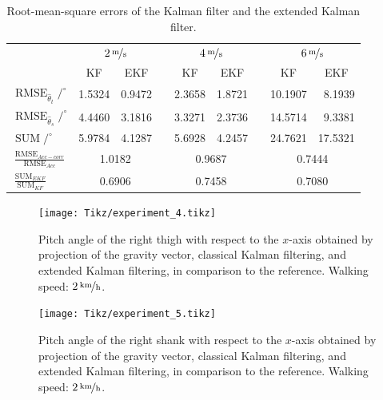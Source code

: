 \begin{table}\centering
{}
\begin{tabular}{@{}lrrcrrcrr@{}}\toprule
& \multicolumn{2}{c}{$\unitfrac[2]{m}{s}$} & \phantom{abc} & \multicolumn{2}{c}{$\unitfrac[4]{m}{s}$} &
\phantom{abc} & \multicolumn{2}{c}{$\unitfrac[6]{m}{s}$}\\ \cmidrule{2-3} \cmidrule{5-6} \cmidrule{8-9}
& \multicolumn{1}{c}{KF} & \multicolumn{1}{c}{EKF} &&  \multicolumn{1}{c}{KF} & \multicolumn{1}{c}{EKF} &&  \multicolumn{1}{c}{KF} & \multicolumn{1}{c}{EKF} \\ \midrule
$\operatorname{RMSE}_{\hat{\theta}_t} / ^{\circ}$ & 1.5324 & 0.9472 && 2.3658 & 1.8721 && 10.1907 & 8.1939 \\
$\operatorname{RMSE}_{\hat{\theta}_s} / ^{\circ}$ & 4.4460 & 3.1816 && 3.3271 & 2.3736 && 14.5714 & 9.3381 \\
$\operatorname{SUM} / ^{\circ}$ & 5.9784 & 4.1287 && 5.6928 & 4.2457 && 24.7621 & 17.5321 \\ \midrule
$\frac{\operatorname{RMSE}_{Acc-corr}}{\operatorname{RMSE}_{Acc}}$ & \multicolumn{2}{c}{1.0182} & \phantom{abc} & \multicolumn{2}{c}{0.9687} & 
\phantom{abc} & \multicolumn{2}{c}{0.7444}\\
$\frac{\operatorname{SUM}_{EKF}}{\operatorname{SUM}_{KF}}$ & \multicolumn{2}{c}{0.6906} & \phantom{abc} & \multicolumn{2}{c}{0.7458} & 
\phantom{abc} & \multicolumn{2}{c}{0.7080}\\
\bottomrule
\end{tabular}
\caption{Root-mean-square errors of the Kalman filter and the extended Kalman filter.}
\label{tab:rmse}
\end{table}

\begin{figure}
	\centering
	\setlength\figureheight{6.8cm} 
	\setlength\figurewidth{\textwidth}
	\texttt{[image: Tikz/experiment\_4.tikz]}
	\caption{Pitch angle of the right thigh with respect to the $x$-axis obtained by projection of the gravity vector, classical Kalman filtering, and extended Kalman filtering, in comparison to the reference. Walking speed: $\unitfrac[2]{km}{h}$.}
	\label{fig:experiment_4}
\end{figure}

\begin{figure}
	\centering
	\setlength\figureheight{6.8cm} 
	\setlength\figurewidth{\textwidth}
	\texttt{[image: Tikz/experiment\_5.tikz]}
	\caption{Pitch angle of the right shank with respect to the $x$-axis obtained by projection of the gravity vector, classical Kalman filtering, and extended Kalman filtering, in comparison to the reference. Walking speed: $\unitfrac[2]{km}{h}$.}
	\label{fig:experiment_5}
\end{figure}

